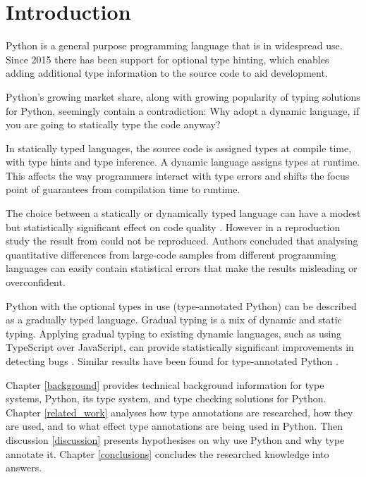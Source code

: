 \chapter{Introduction\label{intro}}

Python is a general purpose programming language that is in widespread use. Since 2015 there has been support for optional type hinting, which enables adding additional type information to the source code to aid development.

Python's growing market share, along with growing popularity of typing solutions for Python, seemingly contain a contradiction: Why adopt a dynamic language, if you are going to statically type the code anyway?

In statically typed languages, the source code is assigned types at compile time, with type hints and type inference. A dynamic language assigns types at runtime. This affects the way programmers interact with type errors and shifts the focus point of guarantees from compilation time to runtime.

The choice between a statically or dynamically typed language can have a modest but statistically significant effect on code quality \cite{nanz_comparative_2015, ray_codequality_2014}. However in a reproduction study \cite{codequality_reproudction_2019} the result from \cite{ray_codequality_2014} could not be reproduced. Authors concluded that analysing quantitative differences from large-code samples from different programming languages can easily contain statistical errors that make the results misleading or overconfident.

Python with the optional types in use (type-annotated Python) can be described as a gradually typed language. Gradual typing is a mix of dynamic and static typing. Applying gradual typing to existing dynamic languages, such as using TypeScript over JavaScript, can provide statistically significant improvements in detecting bugs \cite{gao_to_type_or_not_2017}. Similar results have been found for type-annotated Python \cite{khan_empirical_2022, rak-amnouykit_taleoftwo_2020}.

Chapter \ref{background} provides technical background information for type systems, Python, its type system, and type checking solutions for Python. Chapter \ref{related_work} analyses how type annotations are researched, how they are used, and to what effect type annotations are being used in Python. Then discussion \ref{discussion} presents hypothesises on why use Python and why type annotate it. Chapter \ref{conclusions} concludes the researched knowledge into answers.

